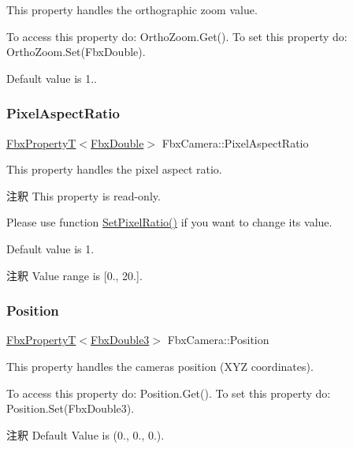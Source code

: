 This property handles the orthographic zoom value.

To access this property do\+: Ortho\+Zoom.\+Get(). To set this property do\+: Ortho\+Zoom.\+Set(\+Fbx\+Double).

Default value is 1.. \mbox{\label{class_fbx_camera_a3fbab252bb6925578cc965f0383592b8}} 
\subsubsection{\texorpdfstring{Pixel\+Aspect\+Ratio}{PixelAspectRatio}}
{\footnotesize\ttfamily \hyperlink{class_fbx_property_t}{Fbx\+PropertyT}$<$\hyperlink{fbxtypes_8h_a171e72a1c46fc15c1a6c9c31948c1c5b}{Fbx\+Double}$>$ Fbx\+Camera\+::\+Pixel\+Aspect\+Ratio}

This property handles the pixel aspect ratio.

\begin{DoxyRemark}{注釈}
This property is read-\/only. 

Please use function \hyperlink{class_fbx_camera_a55058f98c5bdaed70ad02c9062804798}{Set\+Pixel\+Ratio()} if you want to change its value.
\end{DoxyRemark}
Default value is 1. \begin{DoxyRemark}{注釈}
Value range is \mbox{[}0., 20.\mbox{]}. 
\end{DoxyRemark}
\mbox{\label{class_fbx_camera_afa38d19a4ebd6fac7ea040750fd1dae9}} 
\subsubsection{\texorpdfstring{Position}{Position}}
{\footnotesize\ttfamily \hyperlink{class_fbx_property_t}{Fbx\+PropertyT}$<$\hyperlink{fbxtypes_8h_ae0a96f14cde566774c7553aa7523b7a7}{Fbx\+Double3}$>$ Fbx\+Camera\+::\+Position}

This property handles the camera\textquotesingle{}s position (X\+YZ coordinates).

To access this property do\+: Position.\+Get(). To set this property do\+: Position.\+Set(\+Fbx\+Double3).

\begin{DoxyRemark}{注釈}
Default Value is (0., 0., 0.). 
\end{DoxyRemark}
\mbox{\label{class_fbx_camera_ace6cbe41faef53ac2dc02dec31d395a4}} 
